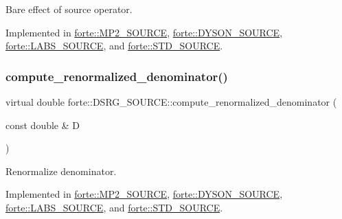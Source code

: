 Bare effect of source operator. 



Implemented in \mbox{\hyperlink{classforte_1_1_m_p2___s_o_u_r_c_e_ac1a5dfafa00da98e4d60b49abfbf1ace}{forte\+::\+M\+P2\+\_\+\+S\+O\+U\+R\+CE}}, \mbox{\hyperlink{classforte_1_1_d_y_s_o_n___s_o_u_r_c_e_a27ff5faaabaa609facbce558d126cc96}{forte\+::\+D\+Y\+S\+O\+N\+\_\+\+S\+O\+U\+R\+CE}}, \mbox{\hyperlink{classforte_1_1_l_a_b_s___s_o_u_r_c_e_a62a2509bdacd3a8456684b90ba6def30}{forte\+::\+L\+A\+B\+S\+\_\+\+S\+O\+U\+R\+CE}}, and \mbox{\hyperlink{classforte_1_1_s_t_d___s_o_u_r_c_e_a37548c104ca908d43d239638ad8b7cde}{forte\+::\+S\+T\+D\+\_\+\+S\+O\+U\+R\+CE}}.

\mbox{\label{classforte_1_1_d_s_r_g___s_o_u_r_c_e_a7345ba63c3612369be7c4cc896b7d5c4}} 
\subsubsection{\texorpdfstring{compute\+\_\+renormalized\+\_\+denominator()}{compute\_renormalized\_denominator()}}
{\footnotesize\ttfamily virtual double forte\+::\+D\+S\+R\+G\+\_\+\+S\+O\+U\+R\+C\+E\+::compute\+\_\+renormalized\+\_\+denominator (\begin{DoxyParamCaption}\item[{const double \&}]{D }\end{DoxyParamCaption})\hspace{0.3cm}{\ttfamily [pure virtual]}}



Renormalize denominator. 



Implemented in \mbox{\hyperlink{classforte_1_1_m_p2___s_o_u_r_c_e_a7aabae75b519e6b52d8fc88626fc1895}{forte\+::\+M\+P2\+\_\+\+S\+O\+U\+R\+CE}}, \mbox{\hyperlink{classforte_1_1_d_y_s_o_n___s_o_u_r_c_e_a2da089db945ae849b5d733493a5b8d39}{forte\+::\+D\+Y\+S\+O\+N\+\_\+\+S\+O\+U\+R\+CE}}, \mbox{\hyperlink{classforte_1_1_l_a_b_s___s_o_u_r_c_e_a2bb2384aa4d711db4c3116e466d56835}{forte\+::\+L\+A\+B\+S\+\_\+\+S\+O\+U\+R\+CE}}, and \mbox{\hyperlink{classforte_1_1_s_t_d___s_o_u_r_c_e_a3f9dda1563d4679949001e604324eb16}{forte\+::\+S\+T\+D\+\_\+\+S\+O\+U\+R\+CE}}.



